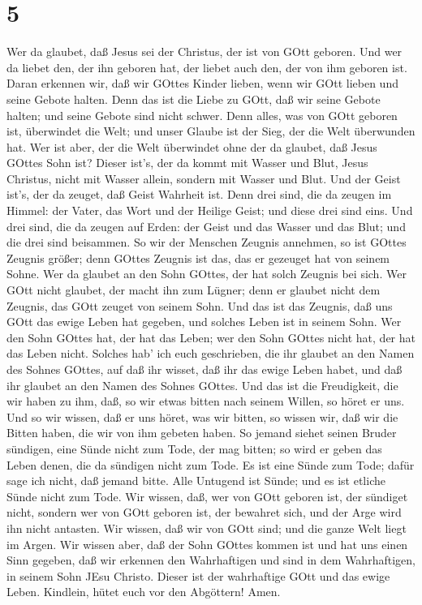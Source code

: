 \hypertarget{section-4}{%
\section{5}\label{section-4}}

 Wer da glaubet, daß Jesus sei der Christus, der ist von
GOtt geboren. Und wer da liebet den, der ihn geboren hat, der liebet
auch den, der von ihm geboren ist.  Daran erkennen wir, daß
wir GOttes Kinder lieben, wenn wir GOtt lieben und seine Gebote halten.
 Denn das ist die Liebe zu GOtt, daß wir seine Gebote
halten; und seine Gebote sind nicht schwer.  Denn alles, was
von GOtt geboren ist, überwindet die Welt; und unser Glaube ist der
Sieg, der die Welt überwunden hat.  Wer ist aber, der die
Welt überwindet ohne der da glaubet, daß Jesus GOttes Sohn ist?
 Dieser ist's, der da kommt mit Wasser und Blut, Jesus
Christus, nicht mit Wasser allein, sondern mit Wasser und Blut. Und der
Geist ist's, der da zeuget, daß Geist Wahrheit ist.  Denn
drei sind, die da zeugen im Himmel: der Vater, das Wort und der Heilige
Geist; und diese drei sind eins.  Und drei sind, die da
zeugen auf Erden: der Geist und das Wasser und das Blut; und die drei
sind beisammen.  So wir der Menschen Zeugnis annehmen, so
ist GOttes Zeugnis größer; denn GOttes Zeugnis ist das, das er gezeuget
hat von seinem Sohne.  Wer da glaubet an den Sohn GOttes,
der hat solch Zeugnis bei sich. Wer GOtt nicht glaubet, der macht ihn
zum Lügner; denn er glaubet nicht dem Zeugnis, das GOtt zeuget von
seinem Sohn.  Und das ist das Zeugnis, daß uns GOtt das
ewige Leben hat gegeben, und solches Leben ist in seinem Sohn.
 Wer den Sohn GOttes hat, der hat das Leben; wer den Sohn
GOttes nicht hat, der hat das Leben nicht.  Solches hab'
ich euch geschrieben, die ihr glaubet an den Namen des Sohnes GOttes,
auf daß ihr wisset, daß ihr das ewige Leben habet, und daß ihr glaubet
an den Namen des Sohnes GOttes.  Und das ist die
Freudigkeit, die wir haben zu ihm, daß, so wir etwas bitten nach seinem
Willen, so höret er uns.  Und so wir wissen, daß er uns
höret, was wir bitten, so wissen wir, daß wir die Bitten haben, die wir
von ihm gebeten haben.  So jemand siehet seinen Bruder
sündigen, eine Sünde nicht zum Tode, der mag bitten; so wird er geben
das Leben denen, die da sündigen nicht zum Tode. Es ist eine Sünde zum
Tode; dafür sage ich nicht, daß jemand bitte.  Alle
Untugend ist Sünde; und es ist etliche Sünde nicht zum Tode.
 Wir wissen, daß, wer von GOtt geboren ist, der sündiget
nicht, sondern wer von GOtt geboren ist, der bewahret sich, und der Arge
wird ihn nicht antasten.  Wir wissen, daß wir von GOtt
sind; und die ganze Welt liegt im Argen.  Wir wissen aber,
daß der Sohn GOttes kommen ist und hat uns einen Sinn gegeben, daß wir
erkennen den Wahrhaftigen und sind in dem Wahrhaftigen, in seinem Sohn
JEsu Christo. Dieser ist der wahrhaftige GOtt und das ewige Leben.
 Kindlein, hütet euch vor den Abgöttern! Amen.

